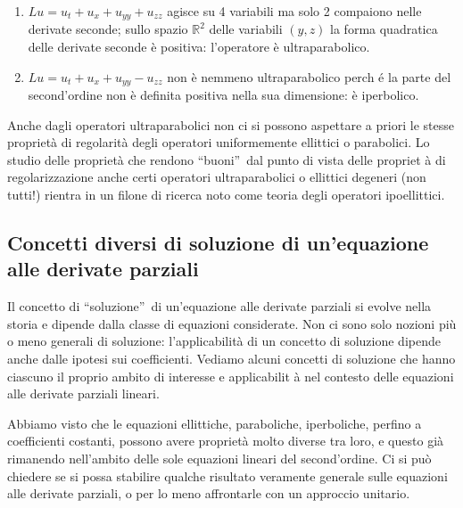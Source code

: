 \documentclass{article}
\begin{document}
\begin{enumerate}
\item $Lu=u_{t}+u_{x}+u_{yy}+u_{zz}$ agisce su 4 variabili ma solo 2
compaiono nelle derivate seconde; sullo spazio $%
\mathbb{R}
^{2}$ delle variabili $(y,z)$ la forma quadratica delle derivate seconde 
\`{e} positiva: l'operatore \`{e} ultraparabolico.

\item $Lu=u_{t}+u_{x}+u_{yy}-u_{zz}$ non \`{e} nemmeno ultraparabolico perch%
\'{e} la parte del second'ordine non \`{e} definita positiva nella sua
dimensione: \`{e} iperbolico.
\end{enumerate}

Anche dagli operatori ultraparabolici non ci si possono aspettare a priori
le stesse propriet\`{a} di regolarit\`{a} degli operatori uniformemente
ellittici o parabolici. Lo studio delle propriet\`{a} che rendono
\textquotedblleft buoni\textquotedblright\ dal punto di vista delle propriet%
\`{a} di regolarizzazione anche certi operatori ultraparabolici o ellittici
degeneri (non tutti!) rientra in un filone di ricerca noto come teoria degli
operatori ipoellittici.

\subsection{Concetti diversi di soluzione di un'equazione alle derivate
parziali}

Il concetto di \textquotedblleft soluzione\textquotedblright\ di
un'equazione alle derivate parziali si evolve nella storia e dipende dalla
classe di equazioni considerate. Non ci sono solo nozioni pi\`{u} o meno
generali di soluzione: l'applicabilit\`{a} di un concetto di soluzione
dipende anche dalle ipotesi sui coefficienti. Vediamo alcuni concetti di
soluzione che hanno ciascuno il proprio ambito di interesse e applicabilit%
\`{a} nel contesto delle equazioni alle derivate parziali lineari.

Abbiamo visto che le equazioni ellittiche, paraboliche, iperboliche, perfino
a coefficienti costanti, possono avere propriet\`{a} molto diverse tra loro,
e questo gi\`{a} rimanendo nell'ambito delle sole equazioni lineari del
second'ordine. Ci si pu\`{o} chiedere se si possa stabilire qualche
risultato veramente generale sulle equazioni alle derivate parziali, o per
lo meno affrontarle con un approccio unitario.
\end{document}

